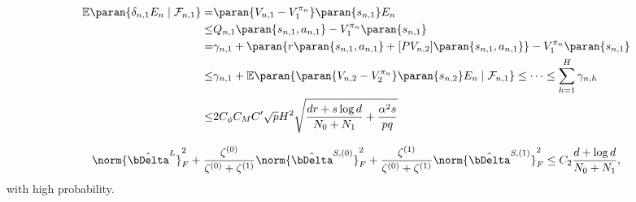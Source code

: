\begin{align*}
\mathbb{E}\paran{\delta_{n,1}E_n \mid \mathcal{F}_{n,1}} =& \paran{V_{n,1} - V_{1}^{\pi_{n}}}\paran{s_{n,1}}E_n \\
\leq &Q_{n,1}\paran{s_{n,1},a_{n,1}} - V_{1}^{\pi_{n}}\paran{s_{n,1}} \\
= &\gamma_{n,1} + \paran{r\paran{s_{n,1},a_{n,1}} +[PV_{n,2}]\paran{s_{n,1},a_{n,1}}} -V_{1}^{\pi_{n}}\paran{s_{n,1}} \\
\leq &\gamma_{n,1} + \mathbb{E}\paran{\paran{V_{n,2} - V_{2}^{\pi_{n}}}\paran{s_{n,2}}E_n \mid \mathcal{F}_{n,1}} 
\leq \cdots \leq \sum_{h=1}^{H}\gamma_{n,h}\\
\leq &2C_{\phi}C_{M}C' \sqrt{p}H^2\sqrt{\frac{dr + s\log d}{N_0 + N_1} + \frac{\alpha^2s}{pq}}
\end{align*}



\begin{theorem}
   
$$\norm{\hat\bDelta^L}_F^2+\dfrac{\zeta^{(0)}}{\zeta^{(0)}+ \zeta^{(1)}}\norm{\hat\bDelta^{S, (0)}}_F^2+\dfrac{\zeta^{(1)}}{\zeta^{(0)}+ \zeta^{(1)}}\norm{\hat\bDelta^{S, (1)}}_F^2
    \leq C_2\frac{d+\log d}{N_0+N_1},$$
    with high probability.
    \label{thm:ts-upperbounds2}
   \end{theorem}

